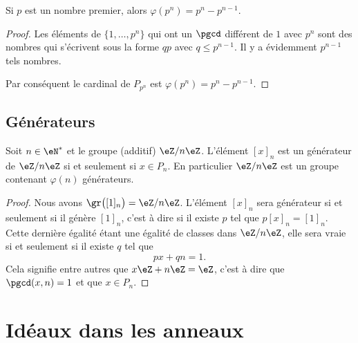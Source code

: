 \begin{lemma}
    Si \( p\) est un nombre premier, alors \( \varphi(p^n)=p^n-p^{n-1}\).
\end{lemma}

\begin{proof}
    Les éléments de \( \{ 1,\ldots,p^n \}\) qui ont un \( \pgcd\) différent de \( 1\) avec \( p^n\) sont des nombres qui s'écrivent sous la forme \( qp\) avec \( q\leq p^{n-1}\). Il y a évidemment \( p^{n-1}\) tels nombres.

    Par conséquent le cardinal de \( P_{p^n}\) est \( \varphi(p^{n})=p^n-p^{n-1}\).
\end{proof}

\subsection{Générateurs}

\begin{proposition}     \label{PropZnmuphiGensn}
    Soit \( n\in\eN^*\) et le groupe (additif) \( \eZ/n\eZ\). L'élément \( [x]_n\) est un générateur de \( \eZ/n\eZ\) si et seulement si \( x\in P_n\). En particulier \( \eZ/n\eZ\) est un groupe contenant \( \varphi(n)\) générateurs.
\end{proposition}

\begin{proof}
    Nous avons \( \gr\big( [1]_n \big)=\eZ/n\eZ\). L'élément \( [x]_n\) sera générateur si et seulement si il génère \( [1]_n \), c'est à dire si il existe \( p\) tel que \( p[x]_n=[1]_n\). Cette dernière égalité étant une égalité de classes dans \( \eZ/n\eZ\), elle sera vraie si et seulement si il existe \( q\) tel que
    \begin{equation}
        px+qn=1.
    \end{equation}
    Cela signifie entre autres que \( x\eZ+n\eZ=\eZ\), c'est à dire que \( \pgcd(x,n)=1\) et que \( x\in P_n\).
\end{proof}

\section{Idéaux dans les anneaux}

